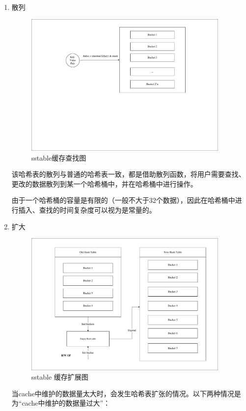 \begin{enumerate}
			\begin{enumerate}
				\item 散列 
				
				\begin{figure}[H]
					\centering
					\includegraphics[width=0.95\textwidth]{pdf/cache_select.pdf}
					\caption{sstable缓存查找图}
					\label{sstable_cache_select}
				\end{figure}
				该哈希表的散列与普通的哈希表一致，都是借助散列函数，将用户需要查找、更改的数据散列到某一个哈希桶中，并在哈希桶中进行操作。

由于一个哈希桶的容量是有限的（一般不大于32个数据），因此在哈希桶中进行插入、查找的时间复杂度可以视为是常量的。

				
				\item 扩大
				
				\begin{figure}[H]
					\centering
					\includegraphics[width=0.95\textwidth]{pdf/cache_expend.pdf}
					\caption{sstable 缓存扩展图}
					\label{sstable_cache_expand}
				\end{figure}
				当cache中维护的数据量太大时，会发生哈希表扩张的情况。以下两种情况是为“cache中维护的数据量过大”：


\end{enumerate}
\end{enumerate}
